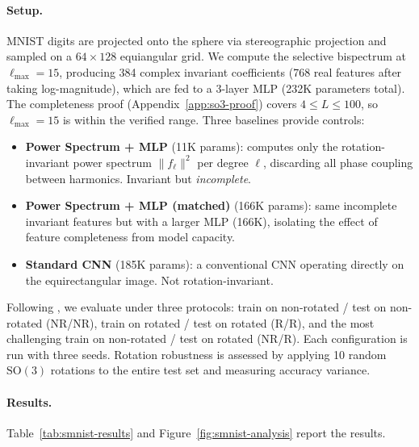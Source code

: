 \documentclass{article}
\theoremstyle{definition}
\theoremstyle{remark}
\newcommand{\SO}{\mathrm{SO}}
\theoremstyle{definition}
\begin{document}
\paragraph{Setup.}
MNIST digits are projected onto the sphere via stereographic projection and
sampled on a $64 \times 128$ equiangular grid. We compute the selective
bispectrum at $\ell_{\max} = 15$, producing 384 complex invariant
coefficients (768 real features after taking log-magnitude), which are fed to a
3-layer MLP (232K parameters total).  The completeness proof
(Appendix~\ref{app:so3-proof}) covers $4 \le L \le 100$, so
$\ell_{\max} = 15$ is within the verified range. Three baselines provide controls:
\begin{itemize}
  \item \textbf{Power Spectrum + MLP} (11K params): computes only the
    rotation-invariant power spectrum $\|f_\ell\|^2$ per degree $\ell$,
    discarding all phase coupling between harmonics. Invariant but
    \emph{incomplete}.
  \item \textbf{Power Spectrum + MLP (matched)} (166K params): same
    incomplete invariant features but with a larger MLP (166K),
    isolating the effect of feature completeness from model capacity.
  \item \textbf{Standard CNN} (185K params): a conventional CNN operating
    directly on the equirectangular image. Not rotation-invariant.
\end{itemize}
Following \citet{cohen2018spherical}, we evaluate under three
protocols: train on non-rotated / test on non-rotated (NR/NR), train on
rotated / test on rotated (R/R), and the most challenging train on
non-rotated / test on rotated (NR/R). Each configuration is run with three
seeds. Rotation robustness is assessed by applying 10 random $\SO(3)$
rotations to the entire test set and measuring accuracy variance.

\paragraph{Results.}
Table~\ref{tab:smnist-results} and Figure~\ref{fig:smnist-analysis} report
the results.
\end{document}
